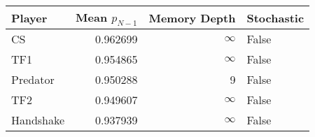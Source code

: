 \begin{tabular}{lrrl}
\toprule
    Player &  Mean $p_{N-1}$ &  Memory Depth & Stochastic \\
\midrule
        CS &        0.962699 &            \(\infty\) &      False \\
       TF1 &        0.954865 &            \(\infty\) &      False \\
  Predator &        0.950288 &             9 &      False \\
       TF2 &        0.949607 &            \(\infty\) &      False \\
 Handshake &        0.937939 &            \(\infty\) &      False \\
\bottomrule
\end{tabular}
